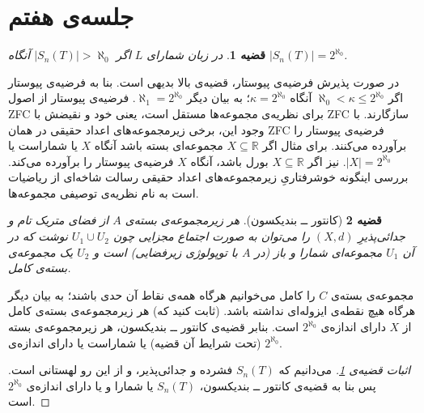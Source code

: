 \documentclass[12pt,a4paper]{article}
\theoremstyle{colorhead}
\newtheorem{thm}{قضیه}
\begin{document}
\section{جلسه‌ی هفتم}
\begin{thm}
\label{andazeyefazayetype}
در زبان شمارای 
$L$
اگر
$|S_n(T)|>\aleph_0$
آنگاه
$|S_n(T)|=2^{\aleph_0}$.
\end{thm}
در صورت پذیرش فرضیه‌ی پیوستار، قضیه‌ی بالا بدیهی است. بنا به فرضیه‌ی پیوستار اگر
$\aleph_0<\kappa\leq  2^{\aleph_0}$
آنگاه 
$\kappa=2^{\aleph_0}$؛
به بیان دیگر
$\aleph_1=2^{\aleph_0}$.
فرضیه‌ی پیوستار از اصول
ZFC
برای نظریه‌ی مجموعه‌ها مستقل است، یعنی خود و نقیضش با
ZFC
سازگارند. با وجود این، برخی زیرمجموعه‌های اعداد حقیقی در همان
ZFC
فرضیه‌ی پیوستار را برآورده می‌کنند. برای مثال اگر
$X\subseteq \mathbb{R}$
مجموعه‌ای بسته باشد آنگاه
$X$
یا شماراست یا
$|X|=2^{\aleph_0}$.
نیز اگر
$X\subseteq \mathbb{R}$
بورل باشد، آنگاه 
$X$
فرضیه‌ی پیوستار را برآورده می‌کند. بررسی اینگونه خوشرفتاریِ زیرمجموعه‌های اعداد حقیقی
رسالت شاخه‌ای از ریاضیات است به نام 
نظریه‌ی توصیفی مجموعه‌ها.
\begin{thm}[کانتور ــ‌ بندیکسون]
هر زیرمجموعه‌ی بسته‌ی
$A$
از فضای متریک تام 
و جدائی‌پذیرِ
$(X,d)$
را می‌توان به صورت
اجتماع مجزایی چون
$U_1\cup U_2$
نوشت که در آن
$U_1$
مجموعه‌ای شمارا و باز (در
$A$
با توپولوژی زیرفضایی)‌ است و 
$U_2$
یک مجموعه‌ی بسته‌ی 
کامل.
\end{thm}
مجموعه‌ی بسته‌ی
$C$
را کامل می‌خوانیم هرگاه همه‌ی نقاط آن حدی باشند؛  به بیان دیگر هرگاه هیچ نقطه‌ی ایزوله‌ای نداشته باشد. (ثابت کنید که) هر زیرمجموعه‌ی بسته‌ی کامل از
$X$
دارای اندازه‌ی
$2^{\aleph_0}$
است. بنابر قضیه‌ی کانتور ــ‌ بندیکسون، 
هر زیرمجموعه‌ی بسته‌ (تحت شرایط آن قضیه)‌ یا
شماراست یا دارای اندازه‌ی 
$2^{\aleph_0}$.
\begin{proof}[اثبات قضیه‌ی
\ref{andazeyefazayetype}
]
می‌دانیم که
$S_n(T)$
فشرده و جدائی‌پذیر، و از این رو لهستانی است. پس بنا به قضیه‌ی کانتور ــ‌ بندیکسون،
$S_n(T)$
یا شمارا و  یا دارای اندازه‌ی
$2^{\aleph_0}$
است.
\end{proof}
\end{document}
